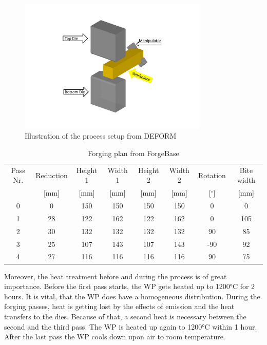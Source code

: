 \begin{figure}[!htbp]
 \centering
 \includegraphics[width=0.8\textwidth]{images/processsetup}
 \caption{Illustration of the process setup from DEFORM}
 \label{img:processsetup}
\end{figure}

\begin{table}[!htbp]%
 \footnotesize
 \centering
 \caption{Forging plan from ForgeBase}
 \begin{tabular}{|c|c|c|c|c|c|c|c|}
 \hline
 Pass Nr.&Reduction&Height 1&Width 1&Height 2&Width 2&Rotation&Bite width\\
 & [mm] & [mm] & [mm] & [mm] & [mm] & [$^{\circ}$] & [mm]\\
 \hline
 0&0&150&150&150&150&0&0\\
 \hline
 1&28&122&162&122&162&0&105\\
 \hline
 2&30&132&132&132&132&90&85\\
 \hline
 3&25&107&143&107&143&-90&92\\
 \hline
 4&27&116&116&116&116&90&75\\
 \hline
 \end{tabular}
 \label{table:forgingplan}
\end{table}

Moreover, the heat treatment before and during the process is of great importance. Before the first pass starts, the WP gets heated up to 1200°C for 2 hours. It is vital, that the WP does have a homogeneous distribution. During the forging passes, heat is getting lost by the effects of emission and the heat transfers to the dies. Because of that, a second heat is necessary between the second and the third pass. The WP is heated up again to 1200°C within 1 hour. After the last pass the WP cools down upon air to room temperature.
